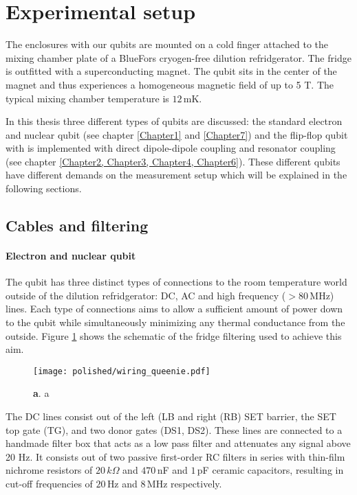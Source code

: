 \section{Experimental setup}

The enclosures with our qubits are mounted on a cold finger attached to the mixing chamber plate of a BlueFors cryogen-free dilution refridgerator. The fridge is outfitted with a superconducting magnet. The qubit sits in the center of the magnet and thus experiences a homogeneous magnetic field of up to 5 T.  The typical mixing chamber temperature is $12\,$mK. 

In this thesis three different types of qubits are discussed: the standard electron and nuclear qubit (see chapter \ref{Chapter1} and \ref{Chapter7}) and the flip-flop qubit with is implemented with direct dipole-dipole coupling and resonator coupling (see chapter \ref{Chapter2, Chapter3, Chapter4, Chapter6}). These different qubits have different demands on the measurement setup which will be explained in the following sections. 

\subsection{Cables and filtering}

\paragraph{Electron and nuclear qubit}

The qubit has three distinct types of connections to the room temperature world outside of the dilution refridgerator: DC, AC and high frequency ($>80\,$MHz) lines. Each type of connections aims to allow a sufficient amount of power down to the qubit while simultaneously minimizing any thermal conductance from the outside. Figure \ref{fig:queenie_filtering} shows the schematic of the fridge filtering used to achieve this aim. 

\begin{figure}
	\centering
	\texttt{[image: polished/wiring\_queenie.pdf]}
	\caption[queeni filtering]{\textbf{a}. a }
	\label{fig:queenie_filtering}
\end{figure}

The DC lines consist out of the left (LB and right (RB) SET barrier, the SET top gate (TG), and two donor gates (DS1, DS2). These lines are connected to a handmade filter box that acts as a low pass filter and attenuates any signal above 20 Hz. It consists out of two passive
first-order RC filters in series with thin-film nichrome resistors of $20\,k\Omega$ and $470\,$nF and $1\,$pF ceramic capacitors, resulting in cut-off frequencies of $20\,$Hz and $8\,$MHz respectively. 

